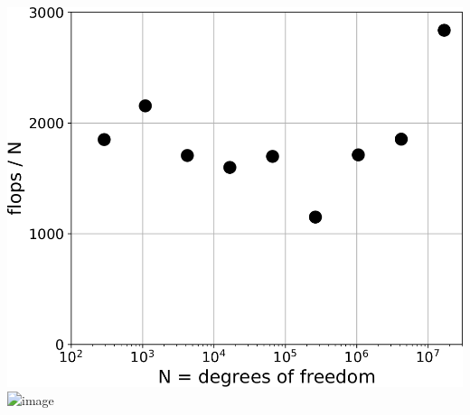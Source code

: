 \documentclass[svgnames,
               hyperref={colorlinks,citecolor=DeepPink4,linkcolor=FireBrick,urlcolor=Maroon},
               usepdftitle=false]  %
               {beamer}
\begin{document}
\begin{frame}[fragile]
\vspace{-22mm}
\hspace{40mm} \includegraphics[height=0.45\textheight]{../talk-oxford/images/obstacle-flops-per-n.png} \qquad \includegraphics<2>[width=20mm]{../talk-oxford/images/frontcover.jpg}
\end{frame}


\newcommand{\stacktwo}[2]{\begin{tabular}{c} #1 \\ #2 \end{tabular}}
\end{document}
